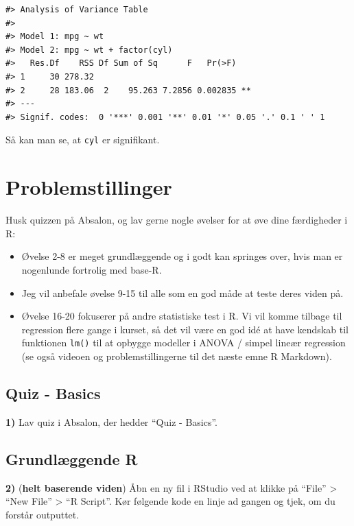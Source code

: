 \documentclass[
]{book}
\providecommand{\tightlist}{%
  \setlength{\itemsep}{0pt}\setlength{\parskip}{0pt}}
\begin{document}
\begin{verbatim}
#> Analysis of Variance Table
#> 
#> Model 1: mpg ~ wt
#> Model 2: mpg ~ wt + factor(cyl)
#>   Res.Df    RSS Df Sum of Sq      F   Pr(>F)   
#> 1     30 278.32                                
#> 2     28 183.06  2    95.263 7.2856 0.002835 **
#> ---
#> Signif. codes:  0 '***' 0.001 '**' 0.01 '*' 0.05 '.' 0.1 ' ' 1
\end{verbatim}

Så kan man se, at \texttt{cyl} er signifikant.

\section{Problemstillinger}\label{problemstillinger}

Husk quizzen på Absalon, og lav gerne nogle øvelser for at øve dine færdigheder i R:

\begin{itemize}
\tightlist
\item
  Øvelse 2-8 er meget grundlæggende og i godt kan springes over, hvis man er nogenlunde fortrolig med base-R.
\item
  Jeg vil anbefale øvelse 9-15 til alle som en god måde at teste deres viden på.
\item
  Øvelse 16-20 fokuserer på andre statistiske test i R. Vi vil komme tilbage til regression flere gange i kurset, så det vil være en god idé at have kendskab til funktionen \texttt{lm()} til at opbygge modeller i ANOVA / simpel lineær regression (se også videoen og problemstillingerne til det næste emne R Markdown).
\end{itemize}

\subsection{Quiz - Basics}\label{quiz---basics}

\textbf{1)} Lav quiz i Absalon, der hedder ``Quiz - Basics''.

\subsection{Grundlæggende R}\label{grundluxe6ggende-r}

\textbf{2)} (\textbf{helt baserende viden}) Åbn en ny fil i RStudio ved at klikke på ``File'' \textgreater{} ``New File'' \textgreater{} ``R Script''. Kør følgende kode en linje ad gangen og tjek, om du forstår outputtet.
\end{document}
